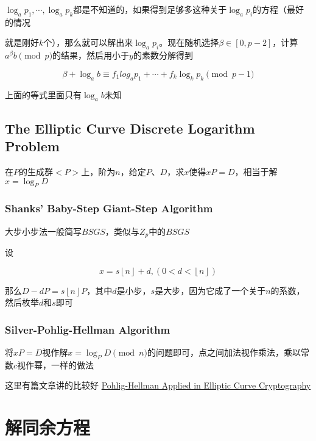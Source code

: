 \documentclass{article}
\begin{document}
$\log_a{p_1},\cdots,\log_a{p_k}$都是不知道的，如果得到足够多这种关于$\log_a{p_i}$的方程（最好的情况

就是刚好$k$个），那么就可以解出来$\log_a{p_i}$。现在随机选择$\beta\in[0,p-2]$，计算$a^{\beta} b\pmod{p}$的结果，然后用小于$y$的素数分解得到

\begin{equation}
    \beta + \log_ab \equiv f_1log_a{p_1}+\cdots+f_k\log_k{p_k}\pmod{p-1}
\end{equation}

上面的等式里面只有$\log_ab$未知

\subsection{The Elliptic Curve Discrete Logarithm Problem}

在$P$的生成群$<P>$上，阶为$n$，给定$P、D$，求$x$使得$xP=D$，相当于解$x=\log_PD$

\subsubsection{Shanks’ Baby-Step Giant-Step Algorithm}

大步小步法一般简写$BSGS$，类似与$Z_p$中的$BSGS$

设

\begin{equation}
    x=s\left\lfloor n\right\rfloor + d, (0 < d < \left\lfloor n\right\rfloor) 
\end{equation}

那么$D-dP=s\left\lfloor n\right\rfloor P$，其中$d$是小步，$s$是大步，因为它成了一个关于$n$的系数，然后枚举$d和s$即可

\subsubsection{Silver-Pohlig-Hellman Algorithm}

将$xP=D$视作解$x=\log_PD\pmod{n}$的问题即可，点之间加法视作乘法，乘以常数$c$视作幂，一样的做法

这里有篇文章讲的比较好 \href{http://koclab.cs.ucsb.edu/teaching/ecc/project/2015Projects/Sommerseth+Hoeiland.pdf}{\color{blue} Pohlig-Hellman Applied in Elliptic Curve Cryptography}

\section{解同余方程}
\end{document}
